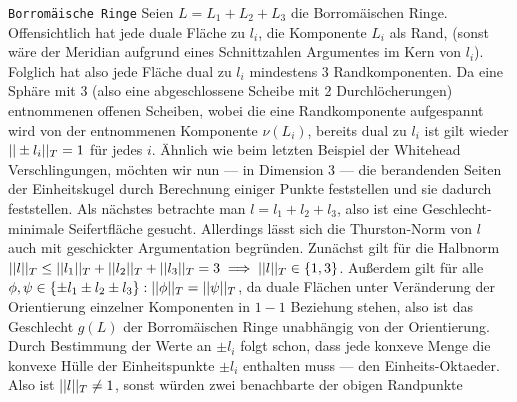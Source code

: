     \texttt{Borromäische Ringe}
    Seien $L=L_1 + L_2 + L_3$ die Borromäischen Ringe. Offensichtlich hat jede duale Fläche zu $l_i$, die Komponente $L_i$ als Rand, (sonst wäre der Meridian aufgrund eines Schnittzahlen Argumentes im Kern von $l_i$). Folglich hat also jede Fläche dual zu $l_i$ mindestens 3 Randkomponenten. Da eine Sphäre mit 3 (also eine abgeschlossene Scheibe mit 2 Durchlöcherungen) entnommenen offenen Scheiben, wobei die eine Randkomponente aufgespannt wird von der entnommenen Komponente $\nu(L_i)$, bereits dual zu $l_i$ ist gilt wieder $||\pm l_i||_T=1$ für jedes $i$. Ähnlich wie beim letzten Beispiel der Whitehead Verschlingungen, möchten wir nun --- in Dimension 3 --- die berandenden Seiten der Einheitskugel durch Berechnung einiger Punkte feststellen und sie dadurch feststellen. Als nächstes betrachte man $l=l_1+l_2+l_3$, also ist eine Geschlecht-minimale Seifertfläche gesucht. Allerdings lässt sich die Thurston-Norm von $l$ auch mit geschickter Argumentation begründen. Zunächst gilt für die Halbnorm $||l||_T \leq ||l_1||_T + ||l_2||_T + ||l_3||_T=3 \implies ||l||_T \in \{1,3\}$. Außerdem gilt für alle $\phi,\psi \in \{\pm l_1 \pm l_2 \pm l_3\}: ||\phi||_T = ||\psi||_T$, da duale Flächen unter Veränderung der Orientierung einzelner Komponenten in $1-1$ Beziehung stehen, also ist das Geschlecht $g(L)$ der Borromäischen Ringe unabhängig von der Orientierung. Durch Bestimmung der Werte an $\pm l_i$ folgt schon, dass jede konxeve Menge die konvexe Hülle der Einheitspunkte $\pm l_i$ enthalten muss --- den Einheits-Oktaeder. Also ist $||l||_T \neq 1$, sonst würden zwei benachbarte der obigen Randpunkte 

